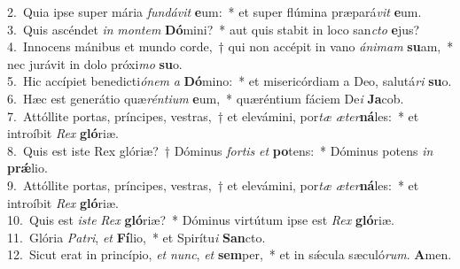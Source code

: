 {2.~}Quia ipse super mária \textit{fun}\textit{dá}\textit{vit} \textbf{e}um:~* et super flúmina præpará\textit{vit} \textbf{e}um.\\
{3.~}Quis ascéndet \textit{in} \textit{mon}\textit{tem} \textbf{Dó}mini?~* aut quis stabit in loco san\textit{cto} \textbf{e}jus?\\
{4.~}Innocens mánibus et mundo corde,~† qui non accépit in vano \textit{á}\textit{ni}\textit{mam} \textbf{su}am,~* nec jurávit in dolo próxi\textit{mo} \textbf{su}o.\\
{5.~}Hic accípiet benedicti\textit{ó}\textit{nem} \textit{a} \textbf{Dó}mino:~* et misericórdiam a Deo, salutá\textit{ri} \textbf{su}o.\\
{6.~}Hæc est generátio quæ\textit{rén}\textit{ti}\textit{um} \textbf{e}um,~* quæréntium fáciem De\textit{i} \textbf{Ja}cob.\\
{7.~}Attóllite portas, príncipes, vestras,~† et elevámini, por\textit{tæ} \textit{æ}\textit{ter}\textbf{ná}les:~* et introíbit \textit{Rex} \textbf{gló}riæ.\\
{8.~}Quis est iste Rex glóriæ?~† Dóminus \textit{for}\textit{tis} \textit{et} \textbf{po}tens:~* Dóminus potens \textit{in} \textbf{prǽ}lio.\\
{9.~}Attóllite portas, príncipes, vestras,~† et elevámini, por\textit{tæ} \textit{æ}\textit{ter}\textbf{ná}les:~* et introíbit \textit{Rex} \textbf{gló}riæ.\\
{10.~}Quis est \textit{i}\textit{ste} \textit{Rex} \textbf{gló}riæ?~* Dóminus virtútum ipse est \textit{Rex} \textbf{gló}riæ.\\
{11.~}Glória \textit{Pa}\textit{tri}, \textit{et} \textbf{Fí}lio,~* et Spirítu\textit{i} \textbf{San}cto.\\
{12.~}Sicut erat in princípio, \textit{et} \textit{nunc}, \textit{et} \textbf{sem}per,~* et in sǽcula sæculó\textit{rum}. \textbf{A}men.\\
